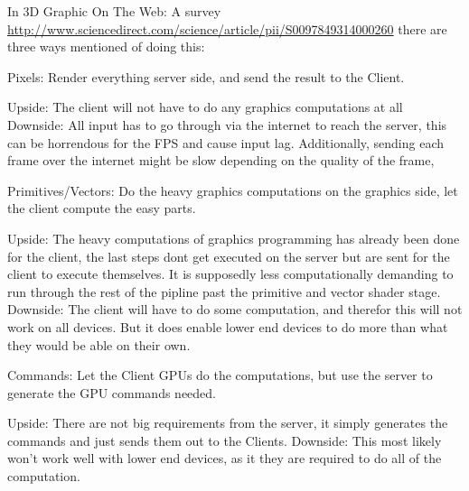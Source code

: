In 3D Graphic On The Web: A survey \url{http://www.sciencedirect.com/science/article/pii/S0097849314000260} there are three ways mentioned of doing this:

Pixels: Render everything server side, and send the result to the Client.

Upside: The client will not have to do any graphics computations at all
Downside: All input has to go through via the internet to reach the server, this can be horrendous for the FPS and cause input lag. Additionally, sending each frame over the internet might be slow depending on the quality of the frame,

Primitives/Vectors: Do the heavy graphics computations on the graphics side, let the client compute the easy parts.

Upside: The heavy computations of graphics programming has already been done for the client, the last steps dont get executed on the server but are sent for the client to execute themselves. It is supposedly less computationally demanding to run through the rest of the pipline past the primitive and vector shader stage. 
Downside: The client will have to do some computation, and therefor this will not work on all devices. But it does enable lower end devices to do more than what they would be able on their own.

Commands: Let the Client GPUs do the computations, but use the server to generate the GPU commands needed.

Upside: There are not big requirements from the server, it simply generates the commands and just sends them out to the Clients.
Downside: This most likely won’t work well with lower end devices, as it they are required to do all of the computation.



